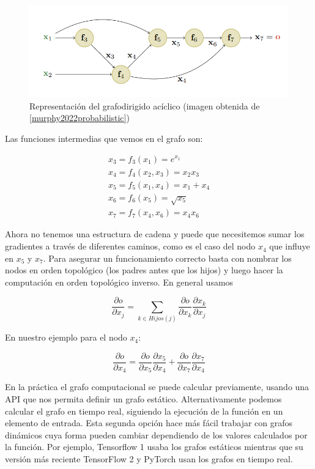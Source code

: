 \begin{figure}
    \centering
    \includegraphics[width=1.0\linewidth]{Plantilla_TFG_latex/imagenes/Mat/Definicion/graf.png}
    \caption{Representación del grafodirigido acíclico (imagen obtenida de \ref{murphy2022probabilistic})}
    \label{fig:def.grafo}
\end{figure}


Las funciones intermedias que vemos en el grafo son:

\begin{gather*}
x_3= f_3(x_1)=e^{x_1} \\
x_4 = f_4(x_2,x_3)=x_2x_3 \\
x_5=f_5(x_1,x_4)=x_1 + x_4 \\
x_6=f_6(x_5) = \sqrt{x_5} \\
x_7=f_7(x_4,x_6)=x_4x_6 
\end{gather*}

Ahora no tenemos una estructura de cadena y puede que necesitemos sumar los gradientes a través de diferentes caminos, como es el caso del nodo $x_4$ que influye en $x_5$ y $x_7$. Para asegurar un funcionamiento correcto basta con nombrar los nodos en orden topológico (los padres antes que los hijos) y luego hacer la computación en orden topológico inverso. En general usamos

$$ \frac{\partial o }{ \partial x_j } = \sum_{k \in Hijos(j)} \frac{\partial o}{ \partial x_k} \frac{\partial x_k}{\partial x_j} $$

En nuestro ejemplo para el nodo $x_4$:

$$   \frac{\partial o }{ \partial x_4 }  =  \frac{\partial o}{ \partial x_5} \frac{\partial x_5}{\partial x_4} +\frac{\partial o}{ \partial x_7} \frac{\partial x_7}{\partial x_4} $$


En la práctica el grafo computacional se puede calcular previamente, usando una API que nos permita definir un grafo estático. Alternativamente podemos calcular el grafo en tiempo real, siguiendo la ejecución de la función en un elemento de entrada. Esta segunda opción hace más fácil trabajar con grafos dinámicos cuya forma pueden cambiar dependiendo de los valores calculados por la función. Por ejemplo, Tensorflow 1 usaba los grafos estáticos mientras que su versión más reciente TensorFlow 2 y PyTorch usan los grafos en tiempo real. 




